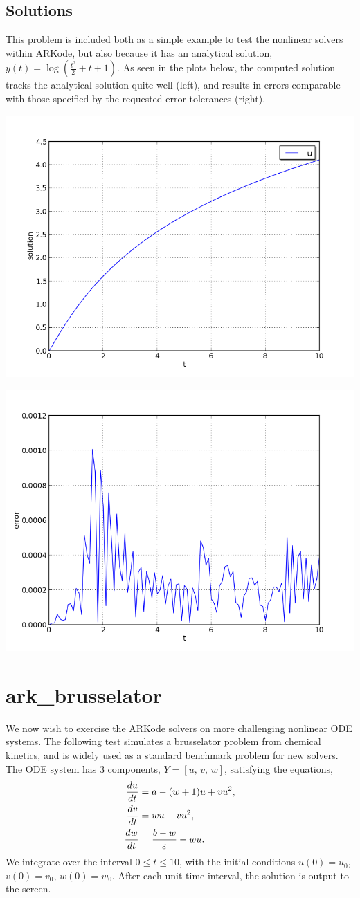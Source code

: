 \documentclass[letterpaper,10pt,english]{sphinxmanual}
\begin{document}
\subsection{Solutions}
\label{c_serial:id4}
This problem is included both as a simple example to test the
nonlinear solvers within ARKode, but also because it has an analytical
solution, \(y(t) = \log\left(\frac{t^2}{2} + t + 1\right)\).  As
seen in the plots below, the computed solution tracks the analytical
solution quite well (left), and results in errors comparable with those
specified by the requested error tolerances (right).

\includegraphics[width=0.450\linewidth]{plot-ark_analytic_nonlin.png}

\includegraphics[width=0.450\linewidth]{plot-ark_analytic_nonlin_error.png}


\section{ark\_brusselator}
\label{c_serial:ark-brusselator}\label{c_serial:id5}
We now wish to exercise the ARKode solvers on more challenging
nonlinear ODE systems.  The following test simulates a brusselator
problem from chemical kinetics, and is widely used as a standard
benchmark problem for new solvers.  The ODE system has 3 components,
\(Y = [u,\, v,\, w]\), satisfying the equations,
\begin{gather}
\begin{split}\frac{du}{dt} &= a - (w+1)u + v u^2, \\
\frac{dv}{dt} &= w u - v u^2, \\
\frac{dw}{dt} &= \frac{b-w}{\varepsilon} - w u.\end{split}\notag
\end{gather}
We integrate over the interval \(0 \le t \le 10\), with the
initial conditions \(u(0) = u_0\), \(v(0) = v_0\), \(w(0)
= w_0\). After each unit time interval, the solution is output to the
screen.
\end{document}
